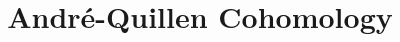 \documentclass{ximera}
\title{Andr\'e-Quillen Cohomology}
\begin{document}
\begin{abstract}

\end{abstract}
\maketitle

\end{document}
